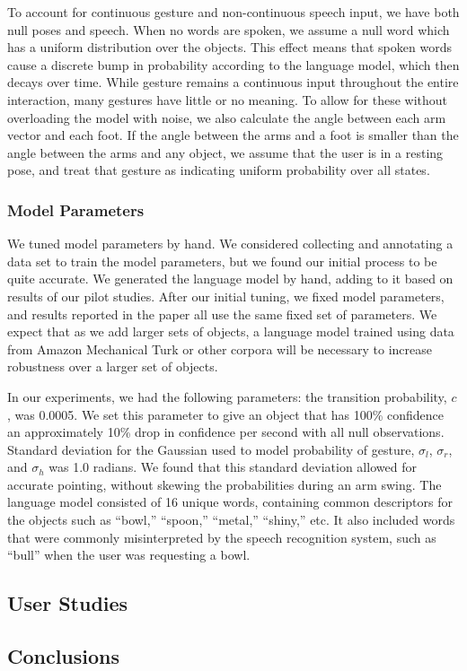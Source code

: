 \documentclass[a4paper, 11pt]{article} %
\begin{document}
To account for continuous gesture and non-continuous speech input, we
have both null poses and speech.  When no words are spoken, we assume
a null word which has a uniform distribution over the objects.  This
effect means that spoken words cause a discrete bump in probability
according to the language model, which then decays over time. While
gesture remains a continuous input throughout the entire interaction,
many gestures have little or no meaning. To allow for these without
overloading the model with noise, we also calculate the angle between
each arm vector and each foot. If the angle between the arms and a
foot is smaller than the angle between the arms and any object, we
assume that the user is in a resting pose, and treat that gesture as
indicating uniform probability over all states.
\subsubsection{Model Parameters}
We tuned model parameters by hand.  We considered collecting and
annotating a data set to train the model parameters, but we found our
initial process to be quite accurate. We generated the language model
by hand, adding to it based on results of our pilot
studies. After our initial tuning, we fixed
  model parameters, and results reported in the paper all use the same
  fixed set of parameters. We expect that as we add
larger sets of objects, a language model trained using data from
Amazon Mechanical Turk or other corpora will be necessary to increase
robustness over a larger set of objects.  

In our experiments, we had the following parameters: the transition
probability, $c$, was 0.0005. We set this parameter to give an object
that has 100\% confidence an approximately 10\% drop in confidence per
second with all null observations.  Standard deviation for the
Gaussian used to model probability of gesture, $\sigma_l$, $\sigma_r$,
and $\sigma_h$ was 1.0 radians. We found that this standard deviation
allowed for accurate pointing, without skewing the probabilities
during an arm swing.  The language model consisted of 16 unique words,
containing common descriptors for the objects such as ``bowl,''
``spoon,'' ``metal,'' ``shiny,'' etc. It also included words that were
commonly misinterpreted by the speech recognition system, such as
``bull'' when the user was requesting a bowl.

\subsection*{User Studies}
\subsection*{Conclusions}
\end{document}
